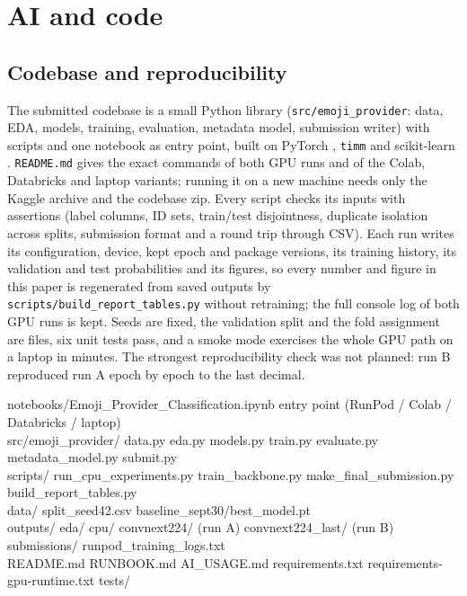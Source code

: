 \documentclass[11pt,a4paper]{article}
\newcommand{\code}[1]{\texttt{#1}}
\begin{document}
\section{AI and code}
\label{sec:code}

\subsection{Codebase and reproducibility}
The submitted codebase is a small Python library (\code{src/emoji\_provider}: data, EDA, models, training, evaluation, metadata model, submission writer) with scripts and one notebook as entry point, built on PyTorch \cite{paszke2019pytorch}, \texttt{timm} \cite{wightman2019timm} and scikit-learn \cite{pedregosa2011sklearn}. \code{README.md} gives the exact commands of both GPU runs and of the Colab, Databricks and laptop variants; running it on a new machine needs only the Kaggle archive and the codebase zip. Every script checks its inputs with assertions (label columns, ID sets, train/test disjointness, duplicate isolation across splits, submission format and a round trip through CSV). Each run writes its configuration, device, kept epoch and package versions, its training history, its validation and test probabilities and its figures, so every number and figure in this paper is regenerated from saved outputs by \code{scripts/build\_report\_tables.py} without retraining; the full console log of both GPU runs is kept. Seeds are fixed, the validation split and the fold assignment are files, six unit tests pass, and a smoke mode exercises the whole GPU path on a laptop in minutes. The strongest reproducibility check was not planned: run B reproduced run A epoch by epoch to the last decimal.

\begin{center}\small
\begin{tcolorbox}[enhanced,colback=panel,colframe=panel,arc=2pt,boxrule=0pt,left=6pt,right=6pt,top=4pt,bottom=4pt,width=\textwidth]
\ttfamily\scriptsize
notebooks/Emoji\_Provider\_Classification.ipynb \hfill\textrm{\color{ink2}entry point (RunPod / Colab / Databricks / laptop)}\\
src/emoji\_provider/ \enspace data.py \; eda.py \; models.py \; train.py \; evaluate.py \; metadata\_model.py \; submit.py\\
scripts/ \enspace run\_cpu\_experiments.py \; train\_backbone.py \; make\_final\_submission.py \; build\_report\_tables.py\\
data/ \enspace split\_seed42.csv \; baseline\_sept30/best\_model.pt\\
outputs/ \enspace eda/ \; cpu/ \; convnext224/ (run A) \; convnext224\_last/ (run B) \; submissions/ \; runpod\_training\_logs.txt\\
README.md \; RUNBOOK.md \; AI\_USAGE.md \; requirements.txt \; requirements-gpu-runtime.txt \; tests/
\end{tcolorbox}
\end{center}
\end{document}
